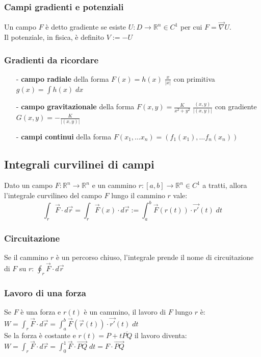 \documentclass[a4paper]{article}
\newcommand\Rn{\mathbb{R}^n}  %
\newcommand\nab{\vec{\nabla}} %
\begin{document}
\subsubsection*{Campi gradienti e potenziali}
Un campo \(F\) è detto gradiente se esiste \(U:D \to \Rn \in C^1\) per cui \(F = \nab U\). \\
Il potenziale, in fisica, è definito \(V := -U\)

\subsubsection*{Gradienti da ricordare}
\begin{itemize}[topsep=3pt, itemsep=0pt]
	\item[-] \textbf{campo radiale} della forma \(F(x) = h(x) \; \frac{x}{\left|x\right|}\) con primitiva \(g(x) = \int h(x) \; dx\)
	\item[-] \textbf{campo gravitazionale} della forma \(F(x,y) = \frac{K}{x^2 + y^2} \; \frac{(x,y)}{\left|(x,y)\right|}\) con gradiente \(G(x,y) = -\frac{K}{\left|(x,y)\right|}\)
	\item[-] \textbf{campi continui} della forma \(F(x_1, \dots x_n) = (f_1(x_1), \dots f_n(x_n))\)
\end{itemize}

\subsection{Integrali curvilinei di campi}
Dato un campo \(F : \Rn \to \Rn\) e un cammino \(r : [a,b] \to \Rn \in C^1\) a tratti, allora l'integrale curvilineo del campo
\(F\) lungo il cammino \(r\) vale:
\[\int_{r} \vec{F} \cdot d \vec{r} = \int_{r} \vec{F}(x) \cdot d\vec{r} := \int_a^b \vec{F}(r(t)) \cdot \vec{r'}(t) \; dt\]

\subsubsection*{Circuitazione}
Se il cammino \(r\) è un percorso chiuso, l'integrale prende il nome di circuitazione di \(F\) su \(r\): \(\displaystyle \oint_r \vec{F} \cdot d\vec{r}\)

\subsubsection*{Lavoro di una forza}
Se \(F\) è una forza e \(r(t)\) è un cammino, il lavoro di \(F\) lungo \(r\) è: \(\displaystyle W = \int_r \vec{F} \cdot d\vec{r} = \int_a^b \vec{F}(\vec{r}(t)) \cdot \vec{r'}(t) \; dt\) \\
Se la forza è costante e \(r(t) = P + t \overline{PQ}\) il lavoro diventa: \(\displaystyle W = \int_r \vec{F} \cdot d\vec{r} = \int_0^1 \vec{F} \cdot \overrightarrow{PQ} \; dt = F \cdot \overrightarrow{PQ}\)
\end{document}

